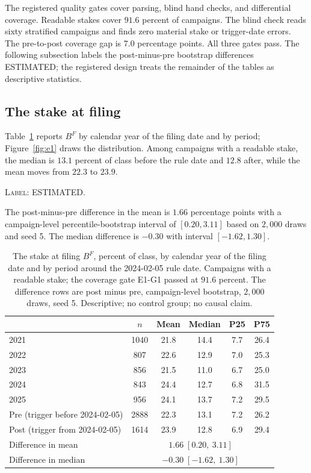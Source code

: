 \documentclass[11pt]{article}
\begin{document}
The registered quality gates cover parsing, blind hand checks, and differential coverage. Readable
stakes cover $91.6$ percent of campaigns. The blind check reads sixty stratified campaigns and finds
zero material stake or trigger-date errors. The pre-to-post coverage gap is $7.0$ percentage points.
All three gates pass. The following subsection labels the post-minus-pre bootstrap differences
ESTIMATED; the registered design treats the remainder of the tables as descriptive statistics.

\subsection{The stake at filing}
\label{sec:e1results}

Table~\ref{tab:e1} reports $B^F$ by calendar year of the filing date and by period;
Figure~\ref{fig:e1} draws the distribution. Among campaigns with a readable stake, the median
is $13.1$ percent of class before the rule date and $12.8$ after, while the mean moves from
$22.3$ to $23.9$.

\noindent\textsc{Label: ESTIMATED.}\par
The post-minus-pre difference in the mean is $1.66$ percentage points with
a campaign-level percentile-bootstrap interval of $[0.20,3.11]$ based on $2{,}000$ draws and
seed 5. The median difference is $-0.30$ with interval $[-1.62,1.30]$.

\begin{table}[H]
\centering
\caption{The stake at filing $B^F$, percent of class, by calendar year of the filing date and
by period around the 2024-02-05 rule date. Campaigns with a readable stake; the coverage gate
E1-G1 passed at $91.6$ percent. The difference rows are post minus pre, campaign-level
bootstrap, $2{,}000$ draws, seed 5. Descriptive; no control group; no causal claim.}
\label{tab:e1}
\begin{tabular}{lccccc}
\toprule
 & $n$ & Mean & Median & P25 & P75 \\
\midrule
2021 & 1040 & 21.8 & 14.4 & 7.7 & 26.4 \\
2022 & 807 & 22.6 & 12.9 & 7.0 & 25.3 \\
2023 & 856 & 21.5 & 11.0 & 6.7 & 25.0 \\
2024 & 843 & 24.4 & 12.7 & 6.8 & 31.5 \\
2025 & 956 & 24.1 & 13.7 & 7.2 & 29.5 \\
\midrule
Pre (trigger before 2024-02-05)  & 2888 & 22.3 & 13.1 & 7.2 & 26.2 \\
Post (trigger from 2024-02-05)    & 1614 & 23.9 & 12.8 & 6.9 & 29.4 \\
\midrule
Difference in mean    & \multicolumn{5}{c}{$1.66 \; [0.20,\ 3.11]$} \\
Difference in median  & \multicolumn{5}{c}{$-0.30 \; [-1.62,\ 1.30]$} \\
\bottomrule
\end{tabular}
\end{table}
\end{document}
